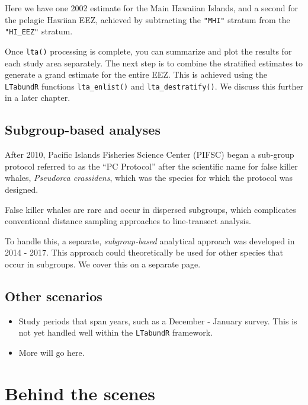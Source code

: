 \documentclass[
]{book}
\begin{document}
Here we have one 2002 estimate for the Main Hawaiian Islands, and a second for the pelagic Hawiian EEZ, achieved by subtracting the \texttt{"MHI"} stratum from the \texttt{"HI\_EEZ"} stratum.

Once \texttt{lta()} processing is complete, you can summarize and plot the results for each study area separately. The next step is to combine the stratified estimates to generate a grand estimate for the entire EEZ. This is achieved using the \texttt{LTabundR} functions \texttt{lta\_enlist()} and \texttt{lta\_destratify()}. We discuss this further in a later chapter.

\hypertarget{subgroup-based-analyses}{%
\subsection*{Subgroup-based analyses}\label{subgroup-based-analyses}}

After 2010, Pacific Islands Fisheries Science Center (PIFSC) began a sub-group protocol referred to as the ``PC Protocol'' after the scientific name for false killer whales, \emph{Pseudorca crassidens}, which was the species for which the protocol was designed.

False killer whales are rare and occur in dispersed subgroups, which complicates conventional distance sampling approaches to line-transect analysis.

To handle this, a separate, \emph{subgroup-based} analytical approach was developed in 2014 - 2017. This approach could theoretically be used for other species that occur in subgroups. We cover this on a separate page.

\hypertarget{other-scenarios}{%
\subsection*{Other scenarios}\label{other-scenarios}}

\begin{itemize}
\item
  Study periods that span years, such as a December - January survey. This is not yet handled well within the \texttt{LTabundR} framework.
\item
  More will go here.
\end{itemize}

\hypertarget{behind-the-scenes-1}{%
\section*{Behind the scenes}\label{behind-the-scenes-1}}
\end{document}
